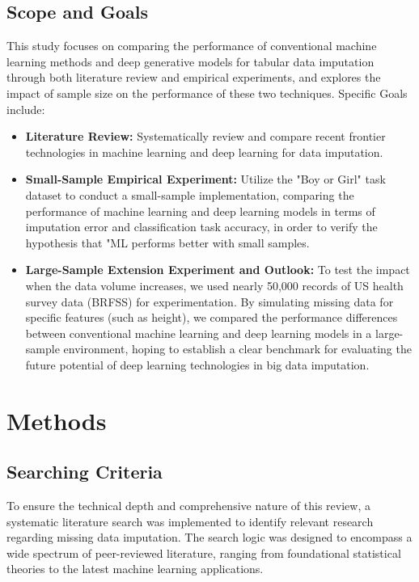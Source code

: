 \documentclass[twocolumn, 9pt]{extarticle}
\begin{document}
\subsection{Scope and Goals}
This study focuses on comparing the performance of conventional machine learning methods and deep generative models for tabular data imputation through both literature review and empirical experiments, and explores the impact of sample size on the performance of these two techniques.
Specific Goals include:
\begin{itemize}[itemsep=2pt, parsep=0pt, topsep=4pt]
    \item \textbf {Literature Review:} Systematically review and compare recent frontier technologies in machine learning and deep learning for data imputation.
    \item \textbf {Small-Sample Empirical Experiment:} Utilize the "Boy or Girl" task dataset to conduct a small-sample implementation, comparing the performance of machine learning and deep learning models in terms of imputation error and classification task accuracy, in order to verify the hypothesis that "ML performs better with small samples.
    \item \textbf {Large-Sample Extension Experiment and Outlook:} To test the impact when the data volume increases, we used nearly 50,000 records of US health survey data (BRFSS) for experimentation. By simulating missing data for specific features (such as height), we compared the performance differences between conventional machine learning and deep learning models in a large-sample environment, hoping to establish a clear benchmark for evaluating the future potential of deep learning technologies in big data imputation.
\end{itemize}


\section{Methods}

\subsection{Searching Criteria}
To ensure the technical depth and comprehensive nature of this review, a systematic literature search was implemented to identify relevant research regarding missing data imputation. The search logic was designed to encompass a wide spectrum of peer-reviewed literature, ranging from foundational statistical theories to the latest machine learning applications.
\end{document}
